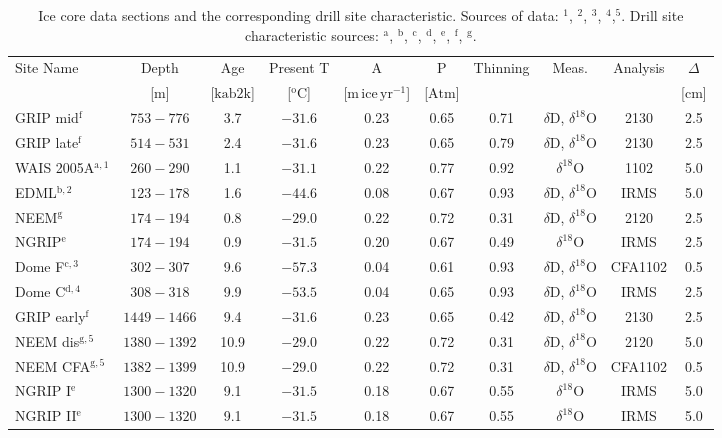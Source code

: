 \documentclass[11pt, draftcls, onecolumn]{IEEEtran} %
\numberwithin{equation}{section}
\numberwithin{table}{section}
\numberwithin{figure}{section}
\begin{document}
\begin{table}
\center
	\caption{Ice core data sections and the corresponding drill site characteristic. Sources of data: \citep{Steig2013}$^\mathrm{1}$, 
		\citep{Oerter2004}$^\mathrm{2}$, \citep{Svensson2015}$^\mathrm{3}$, \citep{Gkinis2011b}$^\mathrm{4}$,\citep{Gkinis2011}$^\mathrm{5}$. Drill site characteristic sources:		
		\citep{Bantaetal2008}$^\mathrm{a}$, \citep{Oerter2004,Veres2013}$^\mathrm{b}$, \citep{Watanabeetal2003,Kawamuraetal2003}$^\mathrm{c}$,
			\citep{Lorius1979}$^\mathrm{d}$, \citep{NGRIPmembers2004,Gkinis2014}$^\mathrm{e}$, \citep{Johnsen2000}$^\mathrm{f}$, \citep{Guillevic2013,Rasmussen2013}$^\mathrm{g}$.
		 }\label{tbl:drill_sites}
	\begin{tabular}{l c c c c c c c c c} 
		\toprule
		Site Name &Depth & Age  & Present T  &
		 A & P & Thinning& Meas. & Analysis&$\Delta$\\
		 &[$\mathrm{m}$]&[$\mathrm{ka b2k}$]&[$^\mathrm{o}\mathrm{C}$]& [$\mathrm{m \, ice \, yr^{-1}}$]&
		  [$\mathrm{Atm}$]& & &&[$\mathrm{cm}$]\\
		\midrule
		GRIP mid$^\mathrm{f}$&$753-776$ & 3.7 &$-31.6 $ & 0.23 & 0.65 & 0.71&$\delta$D, $\delta^{18}$O&2130&2.5\\
		GRIP late$^\mathrm{f}$&$514-531$  &2.4 &$-31.6 $ &0.23 & 0.65  &  0.79&$\delta$D, $\delta^{18}$O&2130&2.5\\	
		WAIS 2005A$^\mathrm{a,1}$ &$260-290$  & 1.1 & $-31.1$ &0.22 & 0.77 & 0.92 &  	 $\delta^{18}$O&1102&5.0\\
		EDML$^\mathrm{b,2}$ & $123-178$&1.6&$-44.6$ & 0.08 & 0.67 & 0.93&$\delta$D, $\delta^{18}$O&IRMS&5.0\\		
		NEEM$^\mathrm{g}$&$174-194 $&0.8 &$-29.0$ & 0.22 &  0.72 &  0.31&$\delta$D, $\delta^{18}$O&2120&2.5\\       
		NGRIP$^\mathrm{e}$ &$174-194$ &0.9 &$-31.5$ & 0.20 & 0.67  & 0.49& $\delta^{18}$O&IRMS&2.5\\			
		Dome F$^\mathrm{c,3}$& $302-307$& 9.6 & $-57.3$ &0.04 & 0.61  &  0.93 &$\delta$D, $\delta^{18}$O&CFA1102&0.5\\
		Dome C$^\mathrm{d,4}$ &$308-318$ & 9.9 &$-53.5 $ &0.04 & 0.65 &   0.93&$\delta$D, $\delta^{18}$O&IRMS&2.5\\
		GRIP early$^\mathrm{f}$&$1449-1466$ & 9.4 &$-31.6 $ & 0.23 & 0.65  &  0.42&$\delta$D, $\delta^{18}$O&2130&2.5\\
		NEEM dis$^\mathrm{g,5}$ &$1380-1392 $&10.9 &$-29.0$ & 0.22 &  0.72 &  0.31&$\delta$D, $\delta^{18}$O&2120&5.0\\       
		NEEM CFA$^\mathrm{g,5}$& $1382-1399$& 10.9 &$-29.0 $& 0.22 & 0.72  & 0.31&$\delta$D, $\delta^{18}$O&CFA1102&0.5\\			
		NGRIP I$^\mathrm{e}$&$1300-1320$ &9.1 &$-31.5$ & 0.18 & 0.67  & 0.55& $\delta^{18}$O&IRMS&5.0\\			
		NGRIP II$^\mathrm{e}$ &$1300-1320$ & 9.1 &$-31.5$ & 0.18 & 0.67  & 0.55&$\delta^{18}$O&IRMS&5.0\\				
		\bottomrule	
	\end{tabular}
\end{table}
\end{document}
